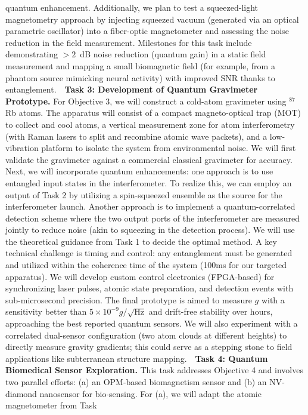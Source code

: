 \documentclass[12pt]{article}
\begin{document}
quantum enhancement. Additionally, we plan to test a squeezed-light
magnetometry approach by injecting squeezed vacuum (generated via an
optical parametric oscillator) into a fiber-optic magnetometer and
assessing the noise reduction in the field
measurement\cite{LIGO2019}. Milestones for this task include
demonstrating $>2$~dB noise reduction (quantum gain) in a static field
measurement and mapping a small biomagnetic field (for example, from a
phantom source mimicking neural activity) with improved SNR thanks to
entanglement.    \textbf{Task 3: Development of Quantum Gravimeter
  Prototype.} For Objective 3, we will construct a cold-atom
gravimeter using $^{87}$Rb atoms. The apparatus will consist of a
compact magneto-optical trap (MOT) to collect and cool atoms, a
vertical measurement zone for atom interferometry (with Raman lasers
to split and recombine atomic wave packets), and a low-vibration
platform to isolate the system from environmental noise. We will first
validate the gravimeter against a commercial classical gravimeter for
accuracy. Next, we will incorporate quantum enhancements: one approach
is to use entangled input states in the interferometer. To realize
this, we can employ an output of Task 2 by utilizing a spin-squeezed
ensemble as the source for the interferometer launch. Another approach
is to implement a quantum-correlated detection scheme where the two
output ports of the interferometer are measured jointly to reduce
noise (akin to squeezing in the detection process). We will use the
theoretical guidance from Task 1 to decide the optimal method. A key
technical challenge is timing and control: any entanglement must be
generated and utilized within the coherence time of the system (100ms
for our targeted apparatus). We will develop custom control
electronics (FPGA-based) for synchronizing laser pulses, atomic state
preparation, and detection events with sub-microsecond precision. The
final prototype is aimed to measure $g$ with a sensitivity better than
$5 \times 10^{-9}g/\sqrt{\text{Hz}}$ and drift-free stability over
hours, approaching the best reported quantum
sensors\cite{Menoret2018}. We will also experiment with a correlated
dual-sensor configuration (two atom clouds at different heights) to
directly measure gravity gradients; this could serve as a stepping
stone to field applications like subterranean structure mapping.   
\textbf{Task 4: Quantum Biomedical Sensor Exploration.} This task
addresses Objective 4 and involves two parallel efforts: (a) an
OPM-based biomagnetism sensor and (b) an NV-diamond nanosensor for
bio-sensing. For (a), we will adapt the atomic magnetometer from Task
\end{document}
